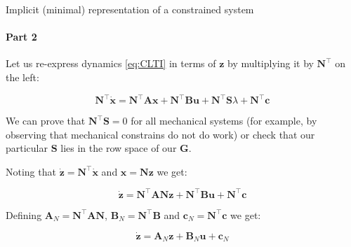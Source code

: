 \documentclass{beamer}
\begin{document}
\begin{frame}{Implicit (minimal) representation of a constrained system}
\framesubtitle{Part 2}
\begin{flushleft}

Let us re-express dynamics \eqref{eq:CLTI} in terms of $\mathbf{z}$ by multiplying it by $\mathbf{N}^\top$ on the left:

\begin{equation}
    \mathbf{N}^\top \dot{\mathbf{x}} = \mathbf{N}^\top \mathbf{A} \mathbf{x} + \mathbf{N}^\top \mathbf{B} \mathbf{u} + \mathbf{N}^\top \mathbf{S} \lambda + \mathbf{N}^\top \mathbf{c}
\end{equation}

We can prove that $\mathbf{N}^\top \mathbf{S} = 0$ for all mechanical systems (for example, by observing that mechanical constrains do not do work) or check that our particular $\mathbf{S}$ lies in the row space of our $\mathbf{G}$.

Noting that $\dot{\mathbf{z}} = \mathbf{N}^\top \dot{\mathbf{x}}$ and $\mathbf{x} = \mathbf{N}\mathbf{z}$ we get:

\begin{equation}
    \dot{\mathbf{z}} = \mathbf{N}^\top \mathbf{A} \mathbf{N} \mathbf{z} + \mathbf{N}^\top \mathbf{B} \mathbf{u} + \mathbf{N}^\top \mathbf{c}
\end{equation}

Defining $\mathbf{A}_N = \mathbf{N}^\top \mathbf{A} \mathbf{N}$, $\mathbf{B}_N = \mathbf{N}^\top \mathbf{B}$ and $\mathbf{c}_N = \mathbf{N}^\top \mathbf{c}$ we get:

\begin{equation}
    \dot{\mathbf{z}} = \mathbf{A}_N \mathbf{z} + \mathbf{B}_N \mathbf{u} + \mathbf{c}_N
\end{equation}

\end{flushleft}
\end{frame}
\end{document}
